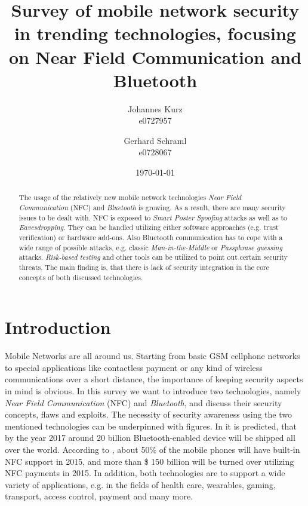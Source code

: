 \documentclass[12pt,a4paper]{article}
\title{ Survey of mobile network security in trending technologies, focusing on Near Field Communication and Bluetooth }
\author{ Johannes Kurz \\
         e0727957 \\%
         \and
         Gerhard Schraml \\
         e0728067 %
}
\date{\today}
\begin{document}
\maketitle

\begin{abstract}
\noindent
The usage of the relatively new mobile network technologies \emph{Near Field Communication} (NFC) and \emph{Bluetooth} is growing. As a result, there are many security issues to be dealt with. NFC is exposed to \emph{Smart Poster Spoofing} attacks as well as to \emph{Eavesdropping}. They can be handled utilizing either software approaches (e.g. trust verification) or hardware add-ons. Also Bluetooth communication has to cope with a wide range of possible attacks, e.g. classic \emph{Man-in-the-Middle} or \emph{Passphrase guessing} attacks. \emph{Risk-based testing} and other tools can be utilized to point out certain security threats. The main finding is, that there is lack of security integration in the core concepts of both discussed technologies.
\end{abstract}


\section{Introduction}

Mobile Networks are all around us. Starting from basic GSM cellphone networks to special applications like contactless payment or any kind of wireless communications over a short distance, the importance of keeping security aspects in mind is obvious. In this survey we want to introduce two technologies, namely \emph{Near Field Communication} (NFC) and \emph{Bluetooth}, and discuss their security concepts, flaws and exploits. The necessity of security awareness using the two mentioned technologies can be underpinned with figures. In \cite{DBLP:conf/greencom/XuZLMLCSTY13} it is predicted, that by the year 2017 around 20 billion Bluetooth-enabled device will be shipped all over the world. According to \cite{DBLP:conf/trustcom/HameedHHK14}, about 50\% of the mobile phones will have built-in NFC support in 2015, and more than \$ 150 billion will be turned over utilizing NFC payments in 2015.
In addition, both technologies are to support a wide variety of applications, e.g. in the fields of health care, wearables, gaming, transport, access control, payment and many more.
\end{document}
